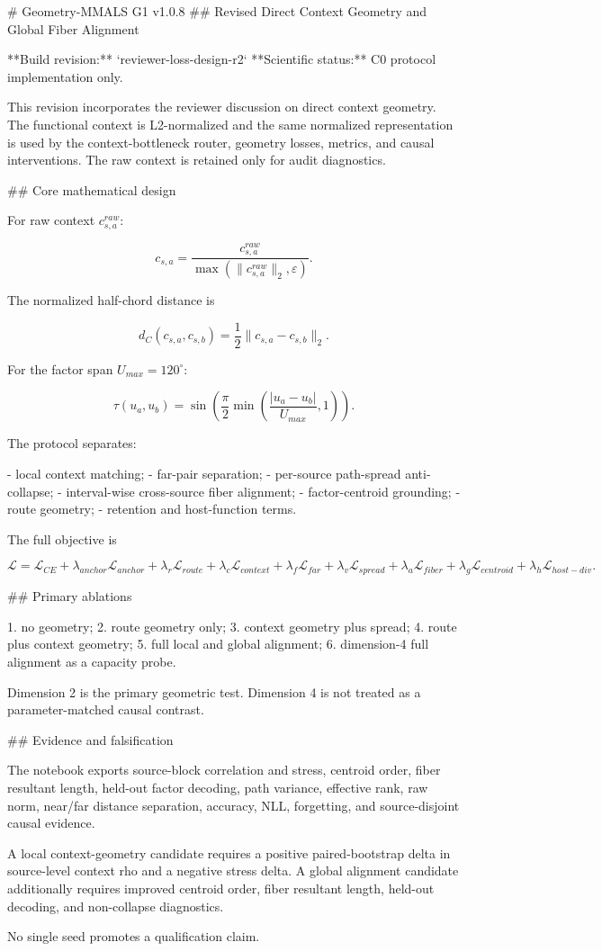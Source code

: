 # Geometry-MMALS G1 v1.0.8
## Revised Direct Context Geometry and Global Fiber Alignment

**Build revision:** `reviewer-loss-design-r2`  
**Scientific status:** C0 protocol implementation only.

This revision incorporates the reviewer discussion on direct context geometry. The functional context is L2-normalized and the same normalized representation is used by the context-bottleneck router, geometry losses, metrics, and causal interventions. The raw context is retained only for audit diagnostics.

## Core mathematical design

For raw context $c^{raw}_{s,a}$:

$$
c_{s,a}=\frac{c^{raw}_{s,a}}{\max(\|c^{raw}_{s,a}\|_2,\varepsilon)}.
$$

The normalized half-chord distance is

$$
d_C(c_{s,a},c_{s,b})=\frac{1}{2}\|c_{s,a}-c_{s,b}\|_2.
$$

For the factor span $U_{max}=120^\circ$:

$$
\tau(u_a,u_b)=\sin\left(\frac{\pi}{2}\min\left(\frac{|u_a-u_b|}{U_{max}},1\right)\right).
$$

The protocol separates:

- local context matching;
- far-pair separation;
- per-source path-spread anti-collapse;
- interval-wise cross-source fiber alignment;
- factor-centroid grounding;
- route geometry;
- retention and host-function terms.

The full objective is

$$
\mathcal L=\mathcal L_{CE}+\lambda_{anchor}\mathcal L_{anchor}+\lambda_r\mathcal L_{route}+\lambda_c\mathcal L_{context}+\lambda_f\mathcal L_{far}+\lambda_v\mathcal L_{spread}+\lambda_a\mathcal L_{fiber}+\lambda_g\mathcal L_{centroid}+\lambda_h\mathcal L_{host-div}.
$$

## Primary ablations

1. no geometry;
2. route geometry only;
3. context geometry plus spread;
4. route plus context geometry;
5. full local and global alignment;
6. dimension-4 full alignment as a capacity probe.

Dimension 2 is the primary geometric test. Dimension 4 is not treated as a parameter-matched causal contrast.

## Evidence and falsification

The notebook exports source-block correlation and stress, centroid order, fiber resultant length, held-out factor decoding, path variance, effective rank, raw norm, near/far distance separation, accuracy, NLL, forgetting, and source-disjoint causal evidence.

A local context-geometry candidate requires a positive paired-bootstrap delta in source-level context rho and a negative stress delta. A global alignment candidate additionally requires improved centroid order, fiber resultant length, held-out decoding, and non-collapse diagnostics.

No single seed promotes a qualification claim.
